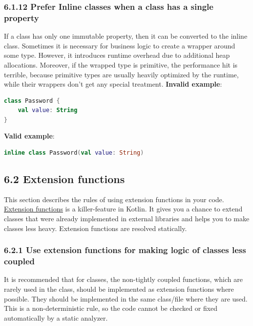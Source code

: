 \subsubsection*{\textbf{6.1.12 Prefer Inline classes when a class has a single property}}
\leavevmode\newline
\label{sec:6.1.12}
If a class has only one immutable property, then it can be converted to the inline class.
Sometimes it is necessary for business logic to create a wrapper around some type. However, it introduces runtime overhead due to additional heap allocations. Moreover, if the wrapped type is primitive, the performance hit is terrible, because primitive types are usually heavily optimized by the runtime, while their wrappers don't get any special treatment.
\textbf{Invalid example}:
\begin{lstlisting}[language=Kotlin]
class Password {
    val value: String
}
\end{lstlisting}
\textbf{Valid example}:
\begin{lstlisting}[language=Kotlin]
inline class Password(val value: String)
\end{lstlisting}
\subsection*{\textbf{6.2 Extension functions}}
\label{sec:6.2}
This section describes the rules of using extension functions in your code.
\href{https://kotlinlang.org/docs/reference/extensions.html}{Extension functions} is a killer-feature in Kotlin. 
It gives you a chance to extend classes that were already implemented in external libraries and helps you to make classes less heavy.
Extension functions are resolved statically.
\subsubsection*{\textbf{6.2.1 Use extension functions for making logic of classes less coupled}}
\leavevmode\newline
\label{sec:6.2.1}
It is recommended that for classes, the non-tightly coupled functions, which are rarely used in the class, should be implemented as extension functions where possible.
They should be implemented in the same class/file where they are used. This is a non-deterministic rule, so the code cannot be checked or fixed automatically by a static analyzer.
